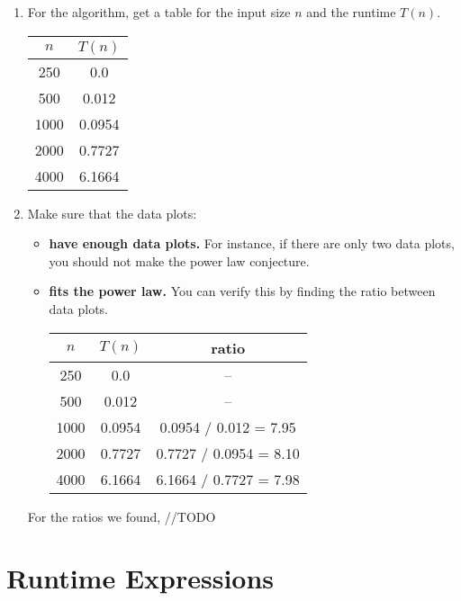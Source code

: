 \documentclass{report}
\begin{document}
\begin{enumerate}
  \item For the algorithm, get a table for the input size $n$ and the runtime $T(n)$.
    \begin{center}
      \begin{tabular}{ | c | c | } %
        \hline
        $n$ & $T(n)$ \\
        \hline
        250 & 0.0 \\
        500 & 0.012 \\
        1000 & 0.0954 \\
        2000 & 0.7727 \\
        4000 & 6.1664 \\
        \hline
      \end{tabular}
    \end{center}
  \item Make sure that the data plots:
    \begin{itemize}
      \item \textbf{have enough data plots.} For instance, if there are only two data plots, you should not make the power law conjecture.
      \item \textbf{fits the power law.} You can verify this by finding the ratio between data plots.
        \begin{center}
          \begin{tabular}{ | c | c | c | }
            \hline
            $n$ & $T(n)$ & ratio \\
            \hline
            250 & 0.0 & -- \\
            500 & 0.012 & -- \\
            1000 & 0.0954 & 0.0954 / 0.012 = 7.95 \\
            2000 & 0.7727 & 0.7727 / 0.0954 = 8.10 \\
            4000 & 6.1664 & 6.1664 / 0.7727 = 7.98 \\
            \hline
          \end{tabular}
        \end{center}
    \end{itemize}
    For the ratios we found, //TODO
\end{enumerate}

\section{Runtime Expressions}
\end{document}
